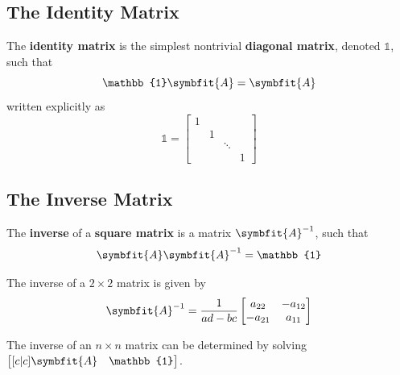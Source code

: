 \documentclass{article}
\begin{document}
\subsection{The Identity Matrix}
\begin{definition}
    The \textbf{identity matrix} is the simplest nontrivial
    \textbf{diagonal matrix}, denoted \(\mathbb{1}\), such that
    \begin{equation*}
        \mathbb{1} \symbfit{A} = \symbfit{A}
    \end{equation*}
    written explicitly as
    \begin{equation*}
        \mathbb{1} =
        \begin{bmatrix}
            1 &   &        &   \\
              & 1 &        &   \\
              &   & \ddots &   \\
              &   &        & 1
        \end{bmatrix}
    \end{equation*}
\end{definition}
\subsection{The Inverse Matrix}
\begin{definition}
    The \textbf{inverse} of a \textbf{square matrix} is a matrix
    \(\symbfit{A}^{-1}\), such that
    \begin{equation*}
        \symbfit{A} \symbfit{A}^{-1} = \mathbb{1}
    \end{equation*}
\end{definition}
\begin{theorem}
    The inverse of a \(2\times 2\) matrix is given by
    \begin{equation*}
        \symbfit{A}^{-1} = \frac{1}{ad-bc}
        \begin{bmatrix}
            a_{22}  & -a_{12} \\
            -a_{21} & a_{11}
        \end{bmatrix}
    \end{equation*}
\end{theorem}
\begin{theorem}
    The inverse of an \(n\times n\) matrix can be determined by solving
    \(
    \begin{bmatrix}[c|c]
        \symbfit{A} & \mathbb{1}
    \end{bmatrix}
    \).
\end{theorem}
\end{document}
